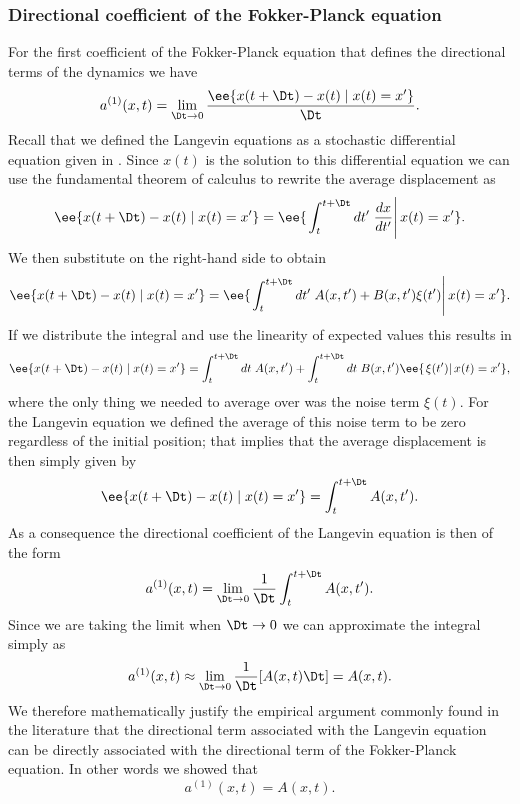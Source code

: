 \subsubsection{Directional coefficient of the Fokker-Planck equation}

For the first coefficient of the Fokker-Planck equation that defines the
directional terms of the dynamics we have
\begin{equation}
    a^{(1)}(x, t) = \lim_{\Dt \rightarrow 0}
    {\ee{x(t + \Dt) - x(t) \mid x(t) = x'} \over \Dt}.
\end{equation}
Recall that we defined the Langevin equations as a stochastic differential
equation given in . Since $x(t)$ is the solution to this
differential equation we can use the fundamental theorem of calculus to rewrite
the average displacement as
\begin{equation}
    \ee{x(t + \Dt) - x(t) \mid x(t) = x'} =
    \ee{\left. \int_t^{t + \Dt} dt'\; {dx \over dt'} \right\vert x(t) = x'}.
\end{equation}
We then substitute  on the right-hand side to obtain
\begin{equation}
    \ee{x(t + \Dt) - x(t) \mid x(t) = x'} =
    \ee{\left.\int_t^{t + \Dt} dt'\; A(x, t') + B(x, t') \xi(t')\right\vert 
    x(t) = x'}.
\end{equation}
If we distribute the integral and use the linearity of expected values this
results in
\begin{equation}
    \ee{x(t + \Dt) - x(t) \mid x(t) = x'} =
    \int_t^{t + \Dt} dt\; A(x, t') + 
    \int_t^{t + \Dt} dt\; B(x, t') \ee{ \left.\xi(t') \right\vert x(t) = x'},
\end{equation}
where the only thing we needed to average over was the noise term $\xi(t)$. For
the Langevin equation we defined the average of this noise term to be zero
regardless of the initial position; that implies that the average displacement
is then simply given by
\begin{equation}
    \ee{x(t + \Dt) - x(t) \mid x(t) = x'} =
    \int_t^{t + \Dt} A(x, t').
\end{equation}
As a consequence the directional coefficient of the Langevin equation is then
of the form
\begin{equation}
    a^{(1)}(x, t) = \lim_{\Dt \rightarrow 0} {1 \over \Dt}
    \int_t^{t + \Dt} A(x, t').
\end{equation}
Since we are taking the limit when $\Dt \rightarrow 0$ we can approximate the
integral simply as
\begin{equation}
    a^{(1)}(x, t) \approx \lim_{\Dt \rightarrow 0}{1 \over \Dt} [A(x, t) \Dt] =
    A(x, t).
    \label{eq_approx_int_directional}
\end{equation}
We therefore mathematically justify the empirical argument commonly found in
the literature that the directional term associated with the Langevin equation
can be directly associated with the directional term of the Fokker-Planck
equation. In other words we showed that
\begin{equation}
    a^{(1)}(x, t) = A(x, t).
\end{equation}

